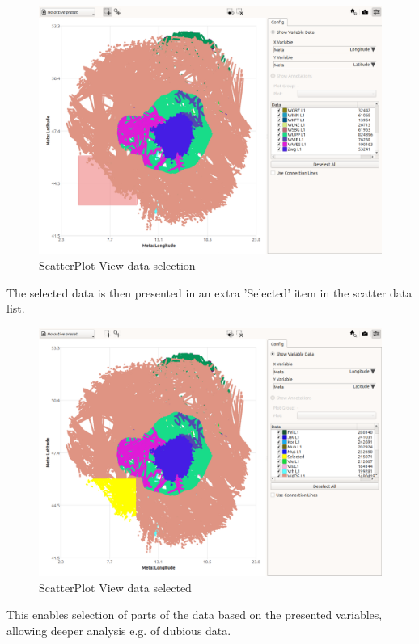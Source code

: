 \begin{figure}[H]
    \hspace*{-2cm}
    \includegraphics[width=18cm,frame]{figures/scatter_select.png}
  \caption{ScatterPlot View data selection}
\end{figure}

The selected data is then presented in an extra 'Selected' item in the scatter data list.

\begin{figure}[H]
    \hspace*{-2cm}
    \includegraphics[width=18cm,frame]{figures/scatter_selected.png}
  \caption{ScatterPlot View data selected}
\end{figure}

This enables selection of parts of the data based on the presented variables, allowing deeper analysis e.g. of dubious data. \\

